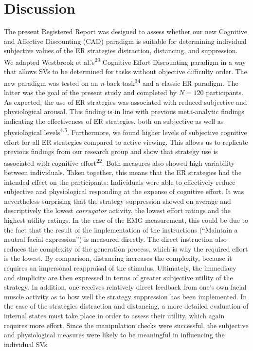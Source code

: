 \documentclass[
  man,floatsintext]{apa6}
\begin{document}
\hypertarget{discussion}{%
\section{Discussion}\label{discussion}}

The present Registered Report was designed to assess whether our new Cognitive and Affective Discounting (CAD) paradigm is suitable for determining individual subjective values of the ER strategies distraction, distancing, and suppression.
We adapted Westbrook et al.'s\textsuperscript{29} Cognitive Effort Discounting paradigm in a way that allows SVs to be determined for tasks without objective difficulty order.
The new paradigm was tested on an \emph{n}-back task\textsuperscript{34} and a classic ER paradigm.
The latter was the goal of the present study and completed by \(N=120\) participants.
As expected, the use of ER strategies was associated with reduced subjective and physiological arousal.
This finding is in line with previous meta-analytic findings indicating the effectiveness of ER strategies, both on subjective as well as physiological levels\textsuperscript{4,5}.
Furthermore, we found higher levels of subjective cognitive effort for all ER strategies compared to active viewing.
This allows us to replicate previous findings from our research group and show that strategy use is associated with cognitive effort\textsuperscript{22}.
Both measures also showed high variability between individuals.
Taken together, this means that the ER strategies had the intended effect on the participants: Individuals were able to effectively reduce subjective and physiological responding at the expense of cognitive effort.
It was nevertheless surprising that the strategy suppression showed on average and descriptively the lowest \emph{corrugator} activity, the lowest effort ratings and the highest utility ratings.
In the case of the EMG measurement, this could be due to the fact that the result of the implementation of the instructions (``Maintain a neutral facial expression'') is measured directly.
The direct instruction also reduces the complexity of the generation process, which is why the required effort is the lowest.
By comparison, distancing increases the complexity, because it requires an impersonal reappraisal of the stimulus.
Ultimately, the immediacy and simplicity are then expressed in terms of greater subjective utility of the strategy.
In addition, one receives relatively direct feedback from one's own facial muscle activity as to how well the strategy suppression has been implemented.
In the case of the strategies distraction and distancing, a more detailed evaluation of internal states must take place in order to assess their utility, which again requires more effort.
Since the manipulation checks were successful, the subjective and physiological measures were likely to be meaningful in influencing the individual SVs.
\end{document}
